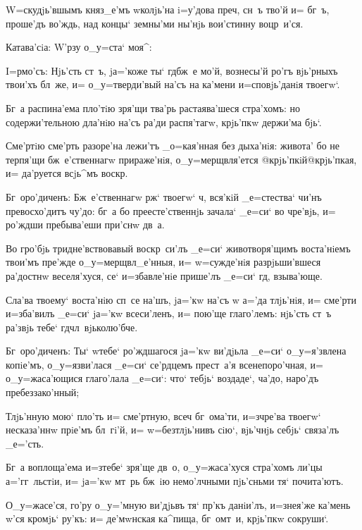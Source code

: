 W=скудjь'вшымъ княз_е'мъ w\т колjь'на i=у'дова 
преч, сн~ъ тво'й и= бг~ъ, проше'дъ во'ждь, над\ъ 
концы` земны'ми ны'нjь вои'стинну воцр~и'ся. 

Катава'сiа: W'рзу о_у=ста` моя^:


I=рмо'съ: Нjь'сть ст~ъ, jа='коже ты` гд бж~е мо'й, 
вознесы'й ро'гъ вjь'рныхъ твои'хъ бл~же, и= 
о_у=тверди'вый на'съ на ка'мени и=сповjь'данiя твоегw`.

Бг~а распина'ема пло'тiю зря'щи тва'рь растаява'шеся 
стра'хомъ: но содержи'тельною дла'нiю на'съ ра'ди 
распя'тагw, крjь'пкw держи'ма бjь`.

Сме'ртiю сме'рть разоре'на лежи'тъ _о=кая'нная без\ъ 
дыха'нiя: живота' бо не терпя'щи бж~е'ственнагw 
прираже'нiя, о_у=мерщвля'ется @крjь'пкiй@{крjь'пкая}, и= 
да'руется всjь^мъ воскр.

Бг~оро'диченъ: Бж~е'ственнагw рж` твоегw` ч, 
вся'кiй _е=стества` чи'нъ превосхо'дитъ чу'до: бг~а бо 
преесте'ственнjь зачала` _е=си` во чре'вjь, и= ро'ждши 
пребыва'еши при'снw дв~а.


Во гро'бjь тридне'вствовавый воскр~си'лъ _е=си` 
животворя'щимъ воста'нiемъ твои'мъ пре'жде 
о_у=мерщвл_е'нныя, и= w=сужде'нiя разрjьши'вшеся 
ра'достнw веселя'хуся, се` и=збавле'нiе прише'лъ _е=си` 
гд, взыва'юще.

Сла'ва твоему` воста'нiю сп~се на'шъ, jа='кw на'съ w\т 
а='да тлjь'нiя, и= сме'рти и=зба'вилъ _е=си` jа='кw 
всеси'ленъ, и= пою'ще глаго'лемъ: нjь'сть ст~ъ ра'звjь 
тебе` гд чл~вjьколю'бче.

Бг~оро'диченъ: Ты` w\т тебе` ро'ждшагося jа='кw 
ви'дjьла _е=си` о_у=я'звлена копiе'мъ, о_у=язви'лася 
_е=си` се'рдцемъ прест~а'я всенепоро'чная, и= 
о_у=жаса'ющися глаго'лала _е=си`: что` тебjь` воздаде`, 
ча'до, наро'дъ пребеззако'нный; 


Тлjь'нную мою` пло'ть и= сме'ртную, всеч 
бг~ома'ти, и=з\ъ чре'ва твоегw` несказа'ннw прiе'мъ 
бл~гi'й, и= w=безтлjь'нивъ сiю`, вjь'чнjь себjь` связа'лъ 
_е='сть. 

Бг~а воплоща'ема и=з\ъ тебе` зря'ще дв~о, 
о_у=жаса'хуся стра'хомъ ли'цы а='гг~льстiи, и= jа='кw 
мт~рь бж~iю немо'лчными пjь'сньми тя` почита'ютъ.

О_у=жасе'ся, го'ру о_у='мную ви'дjьвъ тя` пр'къ 
данiи'лъ, и=з\ъ нея'же ка'мень w'ся кромjь` ру'къ: 
и= де'мwнская ка^пища, бг~омт~и, крjь'пкw сокруши`.

